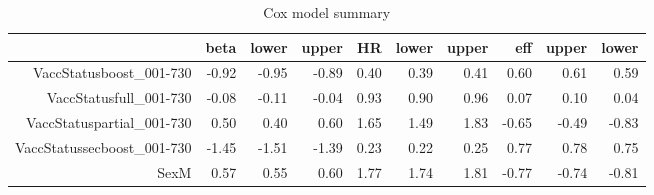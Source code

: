 \begin{table}[ht]
\centering
\begin{tabular}{rrrrrrrrrr}
  \hline
 & beta & lower & upper & HR & lower & upper & eff & upper & lower \\ 
  \hline
VaccStatusboost\_001-730 & -0.92 & -0.95 & -0.89 & 0.40 & 0.39 & 0.41 & 0.60 & 0.61 & 0.59 \\ 
  VaccStatusfull\_001-730 & -0.08 & -0.11 & -0.04 & 0.93 & 0.90 & 0.96 & 0.07 & 0.10 & 0.04 \\ 
  VaccStatuspartial\_001-730 & 0.50 & 0.40 & 0.60 & 1.65 & 1.49 & 1.83 & -0.65 & -0.49 & -0.83 \\ 
  VaccStatussecboost\_001-730 & -1.45 & -1.51 & -1.39 & 0.23 & 0.22 & 0.25 & 0.77 & 0.78 & 0.75 \\ 
  SexM & 0.57 & 0.55 & 0.60 & 1.77 & 1.74 & 1.81 & -0.77 & -0.74 & -0.81 \\ 
   \hline
\end{tabular}
\caption{Cox model summary} 
\end{table}
